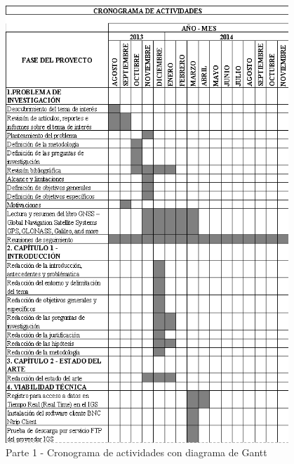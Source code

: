 \begin{figure}[H]
\centering
\includegraphics[width=0.95\textwidth]{images/Gantt_1}
\caption{Parte 1 - Cronograma de actividades con diagrama de Gantt}
\label{fig:3.1}
\end{figure}

